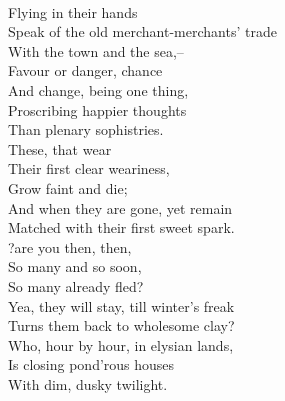 \documentclass[smalldemyvopaper,11pt,twoside,onecolumn,openright,extrafontsizes]{memoir}
\begin{document}
\\Flying in their hands
\\Speak of the old merchant-merchants' trade
\\With the town and the sea,--
\\Favour or danger, chance
\\And change, being one thing,
\\Proscribing happier thoughts
\\Than plenary sophistries.
\\These, that wear
\\Their first clear weariness,
\\Grow faint and die;
\\And when they are gone, yet remain
\\Matched with their first sweet spark.
\\?are you then, then,
\\So many and so soon,
\\So many already fled?
\\Yea, they will stay, till winter's freak
\\Turns them back to wholesome clay?
\\Who, hour by hour, in elysian lands,
\\Is closing pond'rous houses
\\With dim, dusky twilight.
\end{document}
